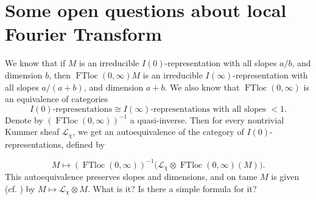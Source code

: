 \section{Some open questions about local Fourier Transform}\label{sec:3.4}

We know that if \(M\) is an irreducible \(I(0)\)-representation with all slopes
\(a/b\), and dimension \(b\), then \(\operatorname{FTloc}(0,\infty)M\) is an
irreducible \(I(\infty)\)-representation with all slopes \(a/(a+b)\), and
dimension \(a+b\). We also know that \(\operatorname{FTloc}(0,\infty)\) is an
equivalence of categories
\[
  I(0)\text{-representations}
  \cong
  I(\infty)\text{-representations with all slopes }<1.
\]
Denote by \((\operatorname{FTloc}(0,\infty))^{-1}\) a quasi-inverse. Then for
every nontrivial Kummer sheaf \(\mathcal{L}_{\chi}\), we get an
autoequivalence of the category of \(I(0)\)-representations, defined by

\[
  M\longmapsto
  (\operatorname{FTloc}(0,\infty))^{-1}
  \bigl(\mathcal{L}_{\overline{\chi}}\otimes
  \operatorname{FTloc}(0,\infty)(M)\bigr).
\]
This autoequivalence preserves slopes and dimensions, and on tame \(M\) is
given (cf. \cite[7.4.4.3]{Ka-ESDE}) by
\(M\mapsto\mathcal{L}_{\chi}\otimes M\). What is it? Is there a simple formula
for it?

